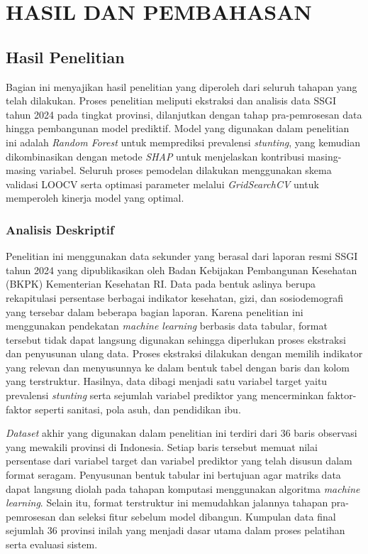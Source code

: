 \chapter{HASIL DAN PEMBAHASAN} \label{Bab IV}

\section{Hasil Penelitian} \label{IV.Hasil}
Bagian ini menyajikan hasil penelitian yang diperoleh dari seluruh tahapan yang telah dilakukan. Proses penelitian meliputi ekstraksi dan analisis data SSGI tahun 2024 pada tingkat provinsi, dilanjutkan dengan tahap pra-pemrosesan data hingga pembangunan model prediktif. Model yang digunakan dalam penelitian ini adalah \textit{Random Forest} untuk memprediksi prevalensi \textit{stunting}, yang kemudian dikombinasikan dengan metode \textit{SHAP} untuk menjelaskan kontribusi masing-masing variabel. Seluruh proses pemodelan dilakukan menggunakan skema validasi LOOCV serta optimasi parameter melalui \textit{GridSearchCV} untuk memperoleh kinerja model yang optimal.

\subsection{Analisis Deskriptif}
Penelitian ini menggunakan data sekunder yang berasal dari laporan resmi SSGI tahun 2024 yang dipublikasikan oleh Badan Kebijakan Pembangunan Kesehatan (BKPK) Kementerian Kesehatan RI. Data pada bentuk aslinya berupa rekapitulasi persentase berbagai indikator kesehatan, gizi, dan sosiodemografi yang tersebar dalam beberapa bagian laporan. Karena penelitian ini menggunakan pendekatan \textit{machine learning} berbasis data tabular, format tersebut tidak dapat langsung digunakan sehingga diperlukan proses ekstraksi dan penyusunan ulang data. Proses ekstraksi dilakukan dengan memilih indikator yang relevan dan menyusunnya ke dalam bentuk tabel dengan baris dan kolom yang terstruktur. Hasilnya, data dibagi menjadi satu variabel target yaitu prevalensi \textit{stunting} serta sejumlah variabel prediktor yang mencerminkan faktor-faktor seperti sanitasi, pola asuh, dan pendidikan ibu.

\textit{Dataset} akhir yang digunakan dalam penelitian ini terdiri dari 36 baris observasi yang mewakili provinsi di Indonesia. Setiap baris tersebut memuat nilai persentase dari variabel target dan variabel prediktor yang telah disusun dalam format seragam. Penyusunan bentuk tabular ini bertujuan agar matriks data dapat langsung diolah pada tahapan komputasi menggunakan algoritma \textit{machine learning}. Selain itu, format terstruktur ini memudahkan jalannya tahapan pra-pemrosesan dan seleksi fitur sebelum model dibangun. Kumpulan data final sejumlah 36 provinsi inilah yang menjadi dasar utama dalam proses pelatihan serta evaluasi sistem.

